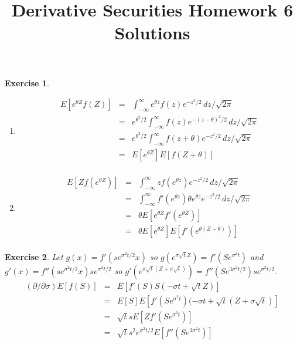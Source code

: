 \documentclass[11pt,fleqn]{amsproc}
\newtheorem{xca}{Exercise}
\begin{document}
\title{Derivative Securities Homework 6 Solutions}

\maketitle

\begin{xca}
\begin{enumerate}
\item
\begin{eqnarray*}
E[e^{\theta Z} f(Z)] &=& \int_{-\infty}^\infty e^{\theta z} f(z) e^{-z^2/2}\,dz/\sqrt{2\pi}\\
	&=& e^{\theta^2/2}\int_{-\infty}^\infty f(z) e^{-(z - \theta)^2/2}\,dz/\sqrt{2\pi}\\
	&=& e^{\theta^2/2}\int_{-\infty}^\infty f(z + \theta) e^{-z^2/2}\,dz/\sqrt{2\pi}\\
	&=& E[e^{\theta Z}] E[f(Z + \theta)]\\
\end{eqnarray*} 

\item
\begin{eqnarray*}
E[Z f(e^{\theta Z})] &=& \int_{-\infty}^\infty z f(e^{\theta z}) e^{-z^2/2}\,dz/\sqrt{2\pi}\\
	&=& \int_{-\infty}^\infty f'(e^{\theta z}) \theta e^{\theta z} e^{-z^2/2}\,dz/\sqrt{2\pi}\\
	&=& \theta E[e^{\theta Z} f'(e^{\theta Z})]\\
	&=& \theta E[e^{\theta Z}] E[f'(e^{\theta (Z + \theta)})]\\
\end{eqnarray*} 

\end{enumerate}
\end{xca}

\begin{xca}
Let $g(x) = f'(se^{\sigma^2 t/2}x)$ so $g(e^{\sigma\sqrt{t} Z}) = f'(Se^{\sigma^2 t})$
and $g'(x) = f''(se^{\sigma^2 t/2}x)se^{\sigma^2 t/2}$ so $g'(e^{\sigma\sqrt{t} (Z + \sigma\sqrt{t})})
 = f''(Se^{3\sigma^2 t/2}) se^{\sigma^2 t/2}$.
\begin{eqnarray*}
(\partial/\partial\sigma)E[f(S)] 
	&=& E[f'(S) S (-\sigma t + \sqrt{t} Z)]\\
	&=& E[S] E[f'(Se^{\sigma^2 t}) (-\sigma t + \sqrt{t} (Z + \sigma\sqrt{t})]\\
	&=& \sqrt{t} s E[Z f'(Se^{\sigma^2 t})]\\
	&=& \sqrt{t} s^2 e^{\sigma^2 t/2} E[f''(Se^{3\sigma^2 t})]\\
\end{eqnarray*}
\end{xca}
\end{document}
